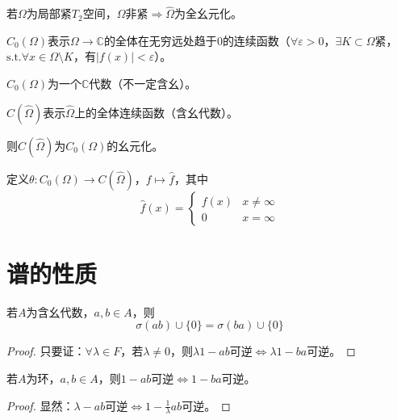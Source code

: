 \documentclass[lang=cn,a4paper,newtx,section]{elegantbook}
\begin{document}
\begin{example}
  若$\Omega$为局部紧$T_2$空间，$\Omega$非紧$\Rightarrow \hat{\Omega}$为全幺元化。
  
  $C_0(\Omega)$表示$\Omega \to \mathbb{C}$的全体在无穷远处趋于$0$的连续函数（$\forall \varepsilon > 0$，$\exists K \subset \Omega$紧，$\text{s.t.} \forall x \in \Omega \setminus K$，有$|f(x)| < \varepsilon$）。
\end{example}

\begin{proposition}
  $C_0(\Omega)$为一个$\mathbb{C}$代数（不一定含幺）。
  
  $C(\hat{\Omega})$表示$\hat{\Omega}$上的全体连续函数（含幺代数）。
  
  则$C(\hat{\Omega})$为$C_0(\Omega)$的幺元化。
  
  定义$\theta: C_0(\Omega) \to C(\hat{\Omega})$，$f \mapsto \hat{f}$，其中
  \begin{equation*}
    \hat{f}(x) = \begin{cases} f(x) & x \neq \infty \\ 0 & x = \infty \end{cases}
  \end{equation*}
\end{proposition}

\section{谱的性质}

\begin{proposition}
  若$A$为含幺代数，$a, b \in A$，则
  \begin{equation*}
    \sigma(ab) \cup \{0\} = \sigma(ba) \cup \{0\}
  \end{equation*}
\end{proposition}

\begin{proof}
  只要证：$\forall \lambda \in F$，若$\lambda \neq 0$，则$\lambda 1 - ab$可逆$\Longleftrightarrow \lambda 1 - ba$可逆。
\end{proof}

\begin{lemma}
  若$A$为环，$a, b \in A$，则$1 - ab$可逆$\Longleftrightarrow 1 - ba$可逆。
\end{lemma}

\begin{proof}
  显然：$\lambda - ab$可逆$\Longleftrightarrow 1 - \frac{1}{\lambda}ab$可逆。
\end{proof}
\end{document}

